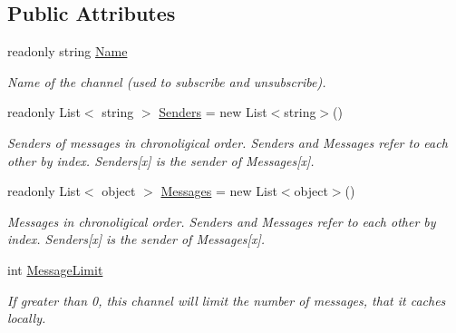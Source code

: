 \subsection*{Public Attributes}
\begin{DoxyCompactItemize}
\item 
readonly string \hyperlink{class_exit_games_1_1_client_1_1_photon_1_1_chat_1_1_chat_channel_ad5488b697206375ef6b13d4fa33eafdf}{Name}
\begin{DoxyCompactList}\small\item\em Name of the channel (used to subscribe and unsubscribe).\end{DoxyCompactList}\item 
readonly List$<$ string $>$ \hyperlink{class_exit_games_1_1_client_1_1_photon_1_1_chat_1_1_chat_channel_a5f663f2af6204ea58ab29a5ee2bee316}{Senders} = new List$<$string$>$()
\begin{DoxyCompactList}\small\item\em Senders of messages in chronoligical order. Senders and Messages refer to each other by index. Senders\mbox{[}x\mbox{]} is the sender of Messages\mbox{[}x\mbox{]}.\end{DoxyCompactList}\item 
readonly List$<$ object $>$ \hyperlink{class_exit_games_1_1_client_1_1_photon_1_1_chat_1_1_chat_channel_a6ed4416ea6c6778dd857c95f3276a005}{Messages} = new List$<$object$>$()
\begin{DoxyCompactList}\small\item\em Messages in chronoligical order. Senders and Messages refer to each other by index. Senders\mbox{[}x\mbox{]} is the sender of Messages\mbox{[}x\mbox{]}.\end{DoxyCompactList}\item 
int \hyperlink{class_exit_games_1_1_client_1_1_photon_1_1_chat_1_1_chat_channel_a647d38d28697bcb1c6600520130d4cbf}{Message\+Limit}
\begin{DoxyCompactList}\small\item\em If greater than 0, this channel will limit the number of messages, that it caches locally.\end{DoxyCompactList}\end{DoxyCompactItemize}

